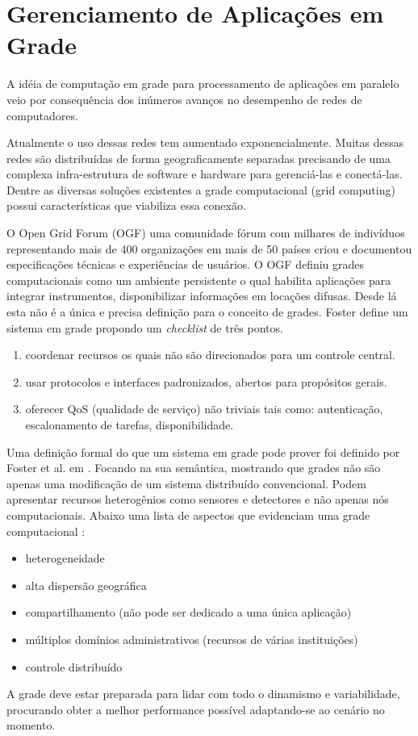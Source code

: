 \chapter{Gerenciamento de Aplicações em Grade}
\label{cap:gerenciamento}

A idéia de computação em grade para processamento de aplicações em paralelo veio por consequência dos inúmeros avanços no desempenho de redes de computadores.

Atualmente o uso dessas redes tem aumentado exponencialmente. Muitas dessas redes são distribuídas de forma geograficamente separadas precisando de uma complexa infra-estrutura de software e hardware para gerenciá-las e conectá-las. Dentre as diversas soluções existentes a grade computacional (grid computing) possui características que viabiliza essa conexão.

O Open Grid Forum (OGF) uma comunidade fórum com milhares de indivíduos representando mais de 400 organizações em mais de 50 países criou e documentou \cite{M.2002} especificações técnicas e experiências de usuários. O OGF definiu grades computacionais como um ambiente persistente o qual habilita aplicações para integrar instrumentos, disponibilizar informações em locações difusas. Desde lá esta não é a única e precisa definição para o conceito de grades. Foster \cite{Kesselman2001} define um sistema em grade propondo um \emph{checklist} de três pontos.

\begin{enumerate}
	\item coordenar recursos os quais não são direcionados para um controle central.
	\item usar protocolos e interfaces padronizados, abertos para propósitos gerais.
	\item oferecer QoS (qualidade de serviço) não triviais tais como: autenticação, escalonamento de tarefas, disponibilidade.
\end{enumerate}

Uma definição formal do que um sistema em grade pode prover foi definido por Foster et al. em \cite{Foster2002}. Focando na sua semântica, mostrando que grades não são apenas uma modificação de um sistema distribuído convencional. Podem apresentar recursos heterogênios como sensores e detectores e não apenas nós computacionais. Abaixo uma lista de aspectos que evidenciam uma grade computacional \cite{Cirne2002}:

\begin{itemize}
	\item heterogeneidade
	\item alta dispersão geográfica
	\item compartilhamento (não pode ser dedicado a uma única aplicação)
	\item múltiplos domínios administrativos (recursos de várias instituições)
	\item controle distribuído 
\end{itemize}

A grade deve estar preparada para lidar com todo o dinamismo e variabilidade, procurando obter a melhor performance possível adaptando-se ao cenário no momento.



